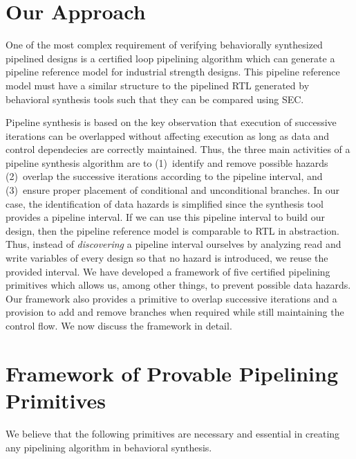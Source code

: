 \section{Our Approach}
\label{sec:pipelining-algorithm}

One of the most complex requirement of 
verifying behaviorally synthesized pipelined designs is a certified loop
pipelining algorithm which can generate a pipeline reference model
for industrial strength designs. This pipeline reference model must have a similar structure to the pipelined RTL generated by behavioral synthesis tools such that they can be compared using SEC. 
  
Pipeline synthesis is based on the key observation that
execution of successive iterations can be overlapped without affecting 
execution as long
as data and control dependecies are correctly maintained. 
Thus, the three main
activities of a pipeline synthesis algorithm are to
(1)~identify and remove possible hazards (2)~overlap the
successive iterations according to the pipeline interval, and (3)~ensure proper placement of conditional and unconditional branches. In our case,
the identification of data hazards is simplified since the synthesis tool
provides a pipeline interval. If we can use this pipeline interval to build our design, then the pipeline reference model is comparable to RTL in abstraction. Thus, instead of {\em
discovering} a pipeline interval ourselves by analyzing read and write variables of every design so that no
hazard is introduced, we reuse the provided interval. 
We have developed a framework of five certified pipelining
primitives which allows us, among other things, to prevent possible data
hazards. Our framework also provides a primitive
to overlap successive iterations and a provision to add and remove branches when required while still maintaining the control flow. We now discuss
the framework in detail.

\section{Framework of Provable Pipelining Primitives}

We believe that the following primitives are necessary and essential in creating any pipelining
algorithm in behavioral synthesis.

